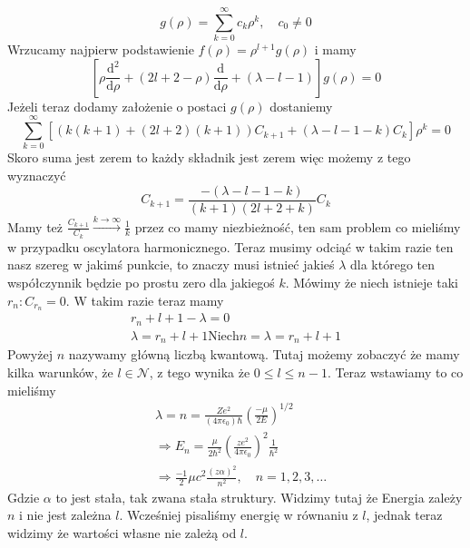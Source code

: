 \begin{equation*}
	g(\rho)=\sum_{k=0}^{\infty} c_{k} \rho^{k}, \quad c_0 \neq 0
\end{equation*}
Wrzucamy najpierw podstawienie $f(\rho) = \rho^{l+1}g(\rho)$ i mamy
\begin{equation*}
	\left[\rho\frac{\text{d}^{2}}{\text{d} \rho}+(2l + 2 - \rho)\frac{\text{d}}{\text{d} \rho} + (\lambda - l - 1)\right] g(\rho)=0
\end{equation*}
Jeżeli teraz dodamy założenie o postaci $g(\rho)$ dostaniemy
\begin{equation*}
	\sum_{k=0}^{\infty}\left[ \left( k(k+1) + (2l+2)(k+1) \right)C_{k+1} + (\lambda - l - 1 -k)C_k \right]\rho^k=0
\end{equation*}
Skoro suma jest zerem to każdy składnik jest zerem więc możemy z tego wyznaczyć
\begin{equation*}
	C_{k+1} = \frac{-(\lambda - l - 1 -k)}{(k+1)(2l+2+k)} C_k
\end{equation*}
Mamy też $\frac{C_{k+1}}{C_k} \xrightarrow{k \to \infty} \frac{1}{k}$ przez co mamy niezbieżność, ten sam problem co mieliśmy w przypadku oscylatora harmonicznego. Teraz musimy odciąć w takim razie ten nasz szereg w jakimś punkcie, to znaczy musi istnieć jakieś $\lambda$ dla którego ten współczynnik będzie po prostu zero dla jakiegoś $k$. Mówimy że niech istnieje taki $r_n:C_{r_n}= 0$. W takim razie teraz mamy
\begin{equation*}
	\begin{gathered}
		r_n+ l +1 - \lambda = 0 \\
		\lambda = r_n + l +1
		\text{Niech} n = \lambda = r_n + l +1
	\end{gathered}
\end{equation*}
Powyżej $n$ nazywamy główną liczbą kwantową. Tutaj możemy zobaczyć że mamy kilka warunków, że $l \in \mathcal{N}$, z tego wynika że $0 \leq l \leq n - 1$. Teraz wstawiamy to co mieliśmy 
\begin{equation*}
	\begin{split}
		&\lambda = n = \frac{Z e^2}{(4 \pi \epsilon_0) \hbar} \left(\frac{-\mu}{2E}\right)^{1/2} \\
		&\Rightarrow E_n = \frac{\mu}{2\hbar^2} \left( \frac{ze^2}{4 \pi \epsilon_0} \right)^2 \frac{1}{\hbar^2} \\
		&\Rightarrow \frac{-1}{2}\mu c^2 \frac{(z\alpha)^2}{n^2}, \quad n = 1, 2, 3, \dotsc
	\end{split}
\end{equation*}
Gdzie $\alpha$ to jest stała, tak zwana stała struktury. Widzimy tutaj że Energia zależy $n$ i nie jest zależna $l$. Wcześniej pisaliśmy energię w równaniu z $l$, jednak teraz widzimy że wartości własne nie zależą od $l$.

